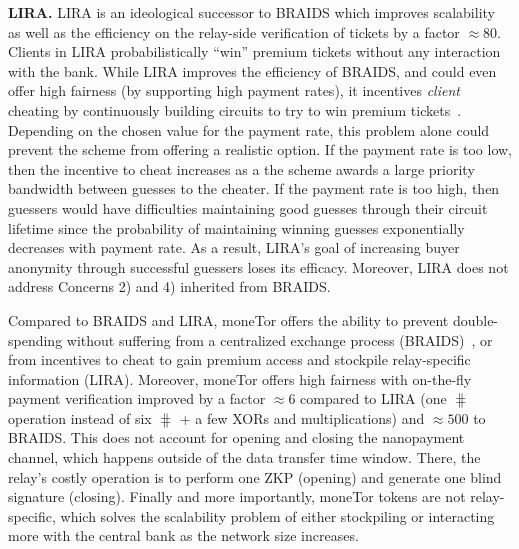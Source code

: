 \medskip\noindent\textbf{LIRA.}
LIRA is an ideological successor to BRAIDS which improves scalability as well as the efficiency on the relay-side verification of tickets by a factor $\approx 80$.
Clients in LIRA probabilistically ``win'' premium tickets without any interaction with the bank.
While LIRA improves the efficiency of BRAIDS, and could even offer high fairness (by supporting high payment rates), it incentives \textit{client} cheating by continuously building circuits to try to win premium tickets~\cite{jansen2013lira, jansenblogpost}.
Depending on the chosen value for the payment rate, this problem alone could prevent the scheme from offering a realistic option.
If the payment rate is too low, then the incentive to cheat increases as a the scheme awards a large priority bandwidth between guesses to the cheater.
If the payment rate is too high, then guessers would have difficulties maintaining good guesses through their circuit lifetime since the probability of maintaining winning guesses exponentially decreases with payment rate.
As a result, LIRA's goal of increasing buyer anonymity through successful guessers loses its efficacy.
Moreover, LIRA does not address Concerns 2) and 4) inherited from BRAIDS.

Compared to BRAIDS and LIRA, moneTor offers the ability to prevent double-spending without suffering from a centralized exchange process (BRAIDS)~\cite{jansenblogpost}, or from incentives to cheat to gain premium access and stockpile relay-specific information (LIRA).
Moreover, moneTor offers high fairness with on-the-fly payment verification improved by a factor $\approx 6$ compared to LIRA (one $\hash$ operation instead of six $\hash$ + a few XORs and multiplications) and $\approx 500$ to BRAIDS.
This does not account for opening and closing the nanopayment channel, which happens outside of the data transfer time window.
There, the relay's costly operation is to perform one ZKP (opening) and generate one blind signature (closing).
Finally and more importantly, moneTor tokens are not relay-specific, which solves the scalability problem of either stockpiling or interacting more with the central bank as the network size increases.

